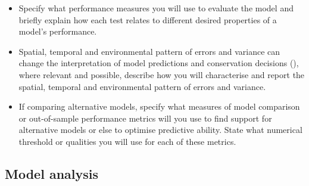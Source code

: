 \documentclass[
]{article}
\providecommand{\tightlist}{%
  \setlength{\itemsep}{0pt}\setlength{\parskip}{0pt}}
\begin{document}
\begin{tcolorbox}[enhanced jigsaw, opacitybacktitle=0.6, bottomrule=.15mm, leftrule=.75mm, rightrule=.15mm, colbacktitle=quarto-callout-caution-color!10!white, toprule=.15mm, titlerule=0mm, left=2mm, colframe=quarto-callout-caution-color-frame, breakable, title=\textcolor{quarto-callout-caution-color}{\faFire}\hspace{0.5em}{Preregistration Item}, opacityback=0, coltitle=black, bottomtitle=1mm, colback=white, toptitle=1mm, arc=.35mm]

\begin{itemize}
\tightlist
\item[$\square$]
  Specify what performance measures you will use to evaluate the model
  and briefly explain how each test relates to different desired
  properties of a model's performance.
\item[$\square$]
  Spatial, temporal and environmental pattern of errors and variance can
  change the interpretation of model predictions and conservation
  decisions (), where
  relevant and possible, describe how you will characterise and report
  the spatial, temporal and environmental pattern of errors and
  variance.
\item[$\square$]
  If comparing alternative models, specify what measures of model
  comparison or out-of-sample performance metrics will you use to find
  support for alternative models or else to optimise predictive ability.
  State what numerical threshold or qualities you will use for each of
  these metrics.
\end{itemize}

\end{tcolorbox}

\subsection{Model analysis}\label{model-analysis}
\end{document}
